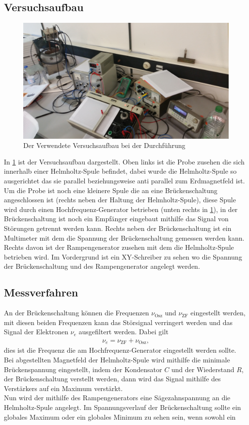 \subsection{Versuchsaufbau}
\begin{figure}[h!]
\centering
\includegraphics[scale = 0.09]{../Grafiken/Aufbau.jpg}
\caption{Der Verwendete Versuchsaufbau bei der Durchführung}\label{fig:Aufbau}
\end{figure}
In \cref{fig:Aufbau} ist der Versuchsaufbau dargestellt. Oben links ist die Probe zusehen die sich innerhalb einer Helmholtz-Spule befindet, dabei wurde die Helmholtz-Spule so ausgerichtet das sie parallel beziehungsweise anti parallel zum Erdmagnetfeld ist. Um die Probe ist noch eine kleinere Spule die an eine Brückenschaltung angeschlossen ist (rechts neben der Haltung der Helmholtz-Spule), diese Spule wird durch einen Hochfrequenz-Generator betrieben (unten rechts in \cref {fig:Aufbau}), in der Brückenschaltung ist noch ein Empfänger eingebaut mithilfe das Signal von Störungen getrennt werden kann. Rechts neben der Brückenschaltung ist ein Multimeter mit dem die Spannung der Brückenschaltung gemessen werden kann. Rechts davon ist der Rampengenerator zusehen mit dem die Helmholtz-Spule betrieben wird. Im Vordergrund ist ein XY-Schreiber zu sehen wo die Spannung der Brückenschaltung und des Rampengenerator angelegt werden.
\subsection{Messverfahren}
An der Brückenschaltung können die Frequenzen $\nu_\text{Osz}$ und $\nu_\text{ZF}$ eingestellt werden, mit diesen beiden Frequenzen kann das Störsignal verringert werden und das Signal der Elektronen $\nu_e$ ausgefiltert werden. Dabei gilt
\begin{align}
	\nu_e=\nu_\text{ZF}+\nu_\text{Osz},
\end{align}
dies ist die Frequenz die am Hochfrequenz-Generator eingestellt werden sollte. Bei abgestellten Magnetfeld der Helmholtz-Spule wird mithilfe die minimale Brückenspannung eingestellt, indem der Kondensator $C$ und der Wiederstand $R$, der Brückenschaltung verstellt werden, dann wird das Signal mithilfe des Verstärkers auf ein Maximum verstärkt.\\
Nun wird der mithilfe des Rampengenerators eine Sägezahnspannung an die Helmholtz-Spule angelegt. Im Spannungsverlauf der Brückenschaltung sollte ein globales Maximum oder ein globales Minimum zu sehen sein, wenn sowohl ein 